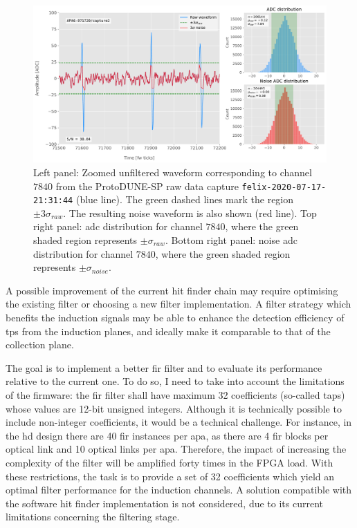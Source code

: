 \begin{figure}[t]
	\centering
	\includegraphics[width=1\linewidth]{Images/Matched_Filter/waveform_example_raw}
	\caption[Example unfiltered waveform from a ProtoDUNE-SP raw data capture.]{Left panel: Zoomed unfiltered waveform corresponding to channel $7840$ from the ProtoDUNE-SP raw data capture \texttt{felix-2020-07-17-21:31:44} (blue line). The green dashed lines mark the region $\pm3\sigma_{raw}$. The resulting noise waveform is also shown (red line). Top right panel: \gls{adc} distribution for channel $7840$, where the green shaded region represents $\pm \sigma_{raw}$. Bottom right panel: noise \gls{adc} distribution for channel $7840$, where the green shaded region represents $\pm \sigma_{noise}$.}
	\label{fig:adcs_nofir}
\end{figure}

A possible improvement of the current hit finder chain may require optimising the existing filter or choosing a new filter implementation. A filter strategy which benefits the induction signals may be able to enhance the detection efficiency of \gls{tp}s from the induction planes, and ideally make it comparable to that of the collection plane.  

The goal is to implement a better \gls{fir} filter and to evaluate its performance relative to the current one. To do so, I need to take into account the limitations of the firmware: the \gls{fir} filter shall have maximum 32 coefficients (so-called taps) whose values are 12-bit unsigned integers. Although it is technically possible to include non-integer coefficients, it would be a technical challenge. For instance, in the \gls{hd} design there are 40 \gls{fir} instances per \gls{apa}, as there are 4 \gls{fir} blocks per optical link and 10 optical links per \gls{apa}. Therefore, the impact of increasing the complexity of the filter will be amplified forty times in the FPGA load. With these restrictions, the task is to provide a set of 32 coefficients which yield an optimal filter performance for the induction channels. A solution compatible with the software hit finder implementation is not considered, due to its current limitations concerning the filtering stage.

